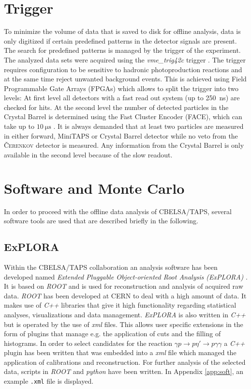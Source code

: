 \section{Trigger}
\label{sec:trig}
To minimize the volume of data that is saved to disk for offline analysis, data is only digitized if certain predefined patterns in the detector signals are present. The search for predefined patterns is managed by the trigger of the experiment. The analyzed data sets were acquired using the \emph{vme\_trig42c} trigger \cite{trig1,trig2}. The trigger requires configuration to be sensitive to hadronic photoproduction reactions and at the same time reject unwanted background events. This is achieved using Field Programmable Gate Arrays (FPGAs) which allows to split the trigger into two levels: At first level all detectors with a fast read out system (up to \SI{250}{\nano\s}) are checked for hits. At the second level the number of detected particles in the Crystal Barrel is determined using the Fast Cluster Encoder (FACE), which can take up to $\SI{10}{\micro\s}$ \cite{face}. It is always demanded that at least two particles are measured in either forward, MiniTAPS or Crystal Barrel detector while no veto from the \textsc{\v Cerenkov} detector is measured. Any information from the Crystal Barrel is only available in the second level because of the slow readout.
\section{Software and Monte Carlo}
\label{sec:mc}
In order to proceed with the offline data analysis of CBELSA/TAPS, several software tools are used that are described briefly in the following.
\subsection{ExPLORA}
Within the CBELSA/TAPS collaboration an analysis software has been developed named \emph{Extended Pluggable Object-oriented Root Analysis (ExPLORA)} \cite{explora}. It is based on \emph{ROOT} \cite{root} and is used for reconstruction and analysis of acquired raw data. \emph{ROOT} has been developed at CERN to deal with a high amount of data. It makes use of \emph{C++} libraries that give it high functionality regarding statistical analyses, visualizations and data management. \emph{ExPLORA} is also written in \emph{C++} but is operated by the use of \emph{xml} files. This allows user specific extensions in the form of plugins that manage e.g. the application of cuts and the filling of histograms. In order to select candidates for the reaction $\gamma p\to p\eta'\to p\gamma\gamma$ a \emph{C++} plugin has been written that was embedded into a \emph{xml} file which managed the application of calibrations and reconstruction. For further analysis of the selected data, scripts in \emph{ROOT} and \emph{python} have been written. In Appendix \ref{app:soft}, an example \texttt{.xml} file is displayed.
